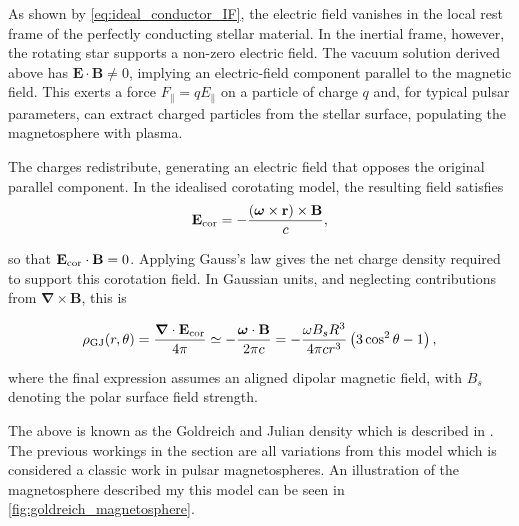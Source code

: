 As shown by \cref{eq:ideal_conductor_IF}, the electric field vanishes in the local rest frame of the perfectly conducting stellar material. In the inertial frame, however, the rotating star supports a non-zero electric field. The vacuum solution derived above has $\mathbf{E}\cdot\mathbf{B}\neq 0$, implying an electric-field component parallel to the magnetic field. This exerts a force $F_\parallel=qE_\parallel$ on a particle of charge $q$ and, for typical pulsar parameters, can extract charged particles from the stellar surface, populating the magnetosphere with plasma.

The charges redistribute, generating an electric field that opposes the original parallel component. In the idealised corotating model, the resulting field satisfies
\begin{equation}
    \mathbf{E}_{\rm cor}
    = -\frac{(\boldsymbol{\omega}\times\mathbf{r})
             \times\mathbf{B}}{c},
\end{equation}

so that $\mathbf{E}_{\rm cor}\cdot\mathbf{B}=0$. Applying Gauss's law gives the net charge density required to support this corotation field. In Gaussian units, and neglecting contributions from $\boldsymbol{\nabla}\times\mathbf{B}$, this is

\begin{equation}
    \rho_{\rm GJ}(r,\theta)
    = \frac{\boldsymbol{\nabla}\cdot\mathbf{E}_{\rm cor}}{4\pi}
    \simeq -\frac{\boldsymbol{\omega}\cdot\mathbf{B}}{2\pi c}
    = -\frac{\omega B_s R^3}{4\pi c r^3}
      \left(3\cos^2\theta-1\right),
    \label{eq:GJchargedensity}
\end{equation}

where the final expression assumes an aligned dipolar magnetic field, with $B_s$ denoting the polar surface field strength.

The above is known as the  Goldreich and Julian density which is described in \cite{goldreich_pulsar_1969}. The previous workings in the section are all variations from this model which is considered a classic work in pulsar magnetospheres. An illustration of the magnetosphere described my this model can be seen in  \cref{fig:goldreich_magnetosphere}.


